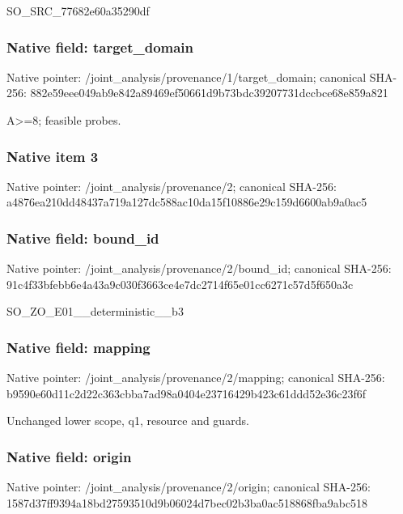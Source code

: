 \documentclass[10pt,a4paper]{article}
\begin{document}
\begingroup\raggedright\sloppy SO\_\allowbreak{}SRC\_\allowbreak{}77682e60a35290df\par\endgroup

\subsubsection{Native field: target\_\allowbreak{}domain}
Native pointer: /joint\_\allowbreak{}analysis/provenance/1/target\_\allowbreak{}domain; canonical SHA-256: 882e59eee049ab9e842a89469ef50661d9b73bdc39207731dccbce68e859a821

\begingroup\raggedright\sloppy A>=\allowbreak{}8;\allowbreak{} feasible probes.\par\endgroup

\subsubsection{Native item 3}
Native pointer: /joint\_\allowbreak{}analysis/provenance/2; canonical SHA-256: a4876ea210dd48437a719a127dc588ac10da15f10886e29c159d6600ab9a0ac5

\subsubsection{Native field: bound\_\allowbreak{}id}
Native pointer: /joint\_\allowbreak{}analysis/provenance/2/bound\_\allowbreak{}id; canonical SHA-256: 91c4f33bfebb6e4a43a9c030f3663ce4e7dc2714f65e01cc6271c57d5f650a3c

\begingroup\raggedright\sloppy SO\_\allowbreak{}ZO\_\allowbreak{}E01\_\allowbreak{}\_\allowbreak{}deterministic\_\allowbreak{}\_\allowbreak{}b3\par\endgroup

\subsubsection{Native field: mapping}
Native pointer: /joint\_\allowbreak{}analysis/provenance/2/mapping; canonical SHA-256: b9590e60d11c2d22c363cbba7ad98a0404e23716429b423c61ddd52e36c23f6f

\begingroup\raggedright\sloppy Unchanged lower scope,\allowbreak{} q1,\allowbreak{} resource and guards.\par\endgroup

\subsubsection{Native field: origin}
Native pointer: /joint\_\allowbreak{}analysis/provenance/2/origin; canonical SHA-256: 1587d37ff9394a18bd27593510d9b06024d7bec02b3ba0ac518868fba9abc518
\end{document}

